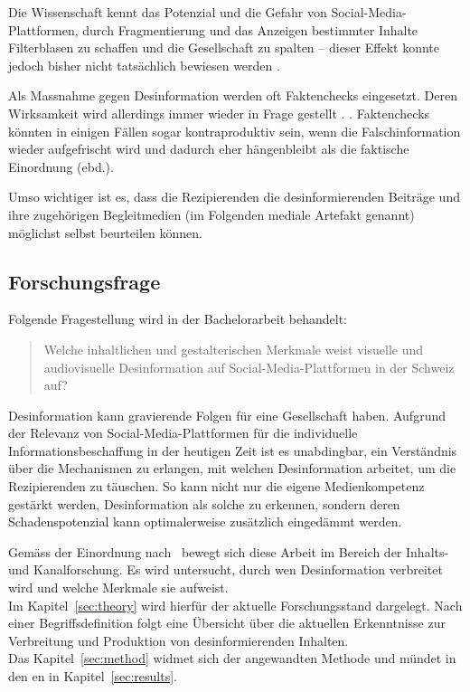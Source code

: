 \documentclass[12pt,a4paper]{article}        %
\begin{document}
Die Wissenschaft kennt das Potenzial und die Gefahr von Social-Media-Plattformen, durch Fragmentierung und das Anzeigen bestimmter Inhalte Filterblasen zu schaffen und die Gesellschaft zu spalten – dieser Effekt konnte jedoch bisher nicht tatsächlich bewiesen werden \parencites[220]{schmidt_meinungsbildung_2022}[25]{moeller_beyond_2018}.

Als Massnahme gegen Desinformation werden oft Faktenchecks eingesetzt. Deren Wirksamkeit wird allerdings immer wieder in Frage gestellt \parencites[1095]{lazer_science_2018}[4f]{ceron_fake_2021}.  \parencites[1095]{lazer_science_2018} \parencite[vgl.\ auch][18]{grujic_warnhinweise_2024}. Faktenchecks könnten in einigen Fällen sogar kontraproduktiv sein, wenn  die Falschinformation wieder aufgefrischt wird und dadurch eher hängenbleibt als die faktische Einordnung (ebd.).

\pagebreak
Umso wichtiger ist es, dass die Rezipierenden die desinformierenden Beiträge und ihre zugehörigen Begleitmedien (im Folgenden mediale Artefakt genannt) möglichst selbst beurteilen können.

\subsection{Forschungsfrage}
\label{thesis}
Folgende Fragestellung wird in der Bachelorarbeit behandelt:
\begin{quote}
  Welche inhaltlichen und gestalterischen Merkmale weist visuelle und audiovisuelle Desinformation auf Social-Media-Plattformen in der Schweiz auf?
\end{quote}
Desinformation kann gravierende Folgen für eine Gesellschaft haben.
Aufgrund der Relevanz von Social-Media-Plattformen für die individuelle Informationsbeschaffung in der heutigen Zeit ist es unabdingbar, ein Verständnis über die Mechanismen zu erlangen, mit welchen Desinformation arbeitet, um die Rezipierenden zu täuschen. So kann nicht nur die eigene Medienkompetenz gestärkt werden, Desinformation als solche zu erkennen, sondern deren Schadenspotenzial kann optimalerweise zusätzlich eingedämmt werden.

Gemäss der Einordnung nach~\cite[37]{lasswell_lasswell_1948} bewegt sich diese Arbeit im Bereich der Inhalts- und Kanalforschung. Es wird untersucht, durch wen Desinformation verbreitet wird und welche Merkmale sie aufweist.\\
\label{structure}
Im Kapitel~\ref{sec:theory}  wird hierfür der aktuelle Forschungsstand dargelegt. Nach einer Begriffsdefinition folgt eine Übersicht über die aktuellen Erkenntnisse zur Verbreitung und Produktion von desinformierenden Inhalten. \\
Das Kapitel~\ref{sec:method}  widmet sich der angewandten Methode und mündet in den en in Kapitel~\ref{sec:results}.
\end{document}

